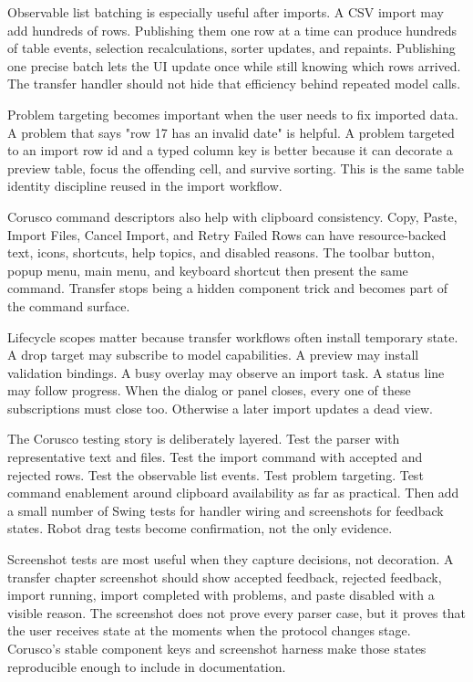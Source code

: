 Observable list batching is especially useful after imports. A CSV import may add hundreds of rows. Publishing them one row at a time can produce hundreds of table events, selection recalculations, sorter updates, and repaints. Publishing one precise batch lets the UI update once while still knowing which rows arrived. The transfer handler should not hide that efficiency behind repeated model calls.

Problem targeting becomes important when the user needs to fix imported data. A problem that says "row 17 has an invalid date" is helpful. A problem targeted to an import row id and a typed column key is better because it can decorate a preview table, focus the offending cell, and survive sorting. This is the same table identity discipline reused in the import workflow.

Corusco command descriptors also help with clipboard consistency. Copy, Paste, Import Files, Cancel Import, and Retry Failed Rows can have resource-backed text, icons, shortcuts, help topics, and disabled reasons. The toolbar button, popup menu, main menu, and keyboard shortcut then present the same command. Transfer stops being a hidden component trick and becomes part of the command surface.

Lifecycle scopes matter because transfer workflows often install temporary state. A drop target may subscribe to model capabilities. A preview may install validation bindings. A busy overlay may observe an import task. A status line may follow progress. When the dialog or panel closes, every one of these subscriptions must close too. Otherwise a later import updates a dead view.

The Corusco testing story is deliberately layered. Test the parser with representative text and files. Test the import command with accepted and rejected rows. Test the observable list events. Test problem targeting. Test command enablement around clipboard availability as far as practical. Then add a small number of Swing tests for handler wiring and screenshots for feedback states. Robot drag tests become confirmation, not the only evidence.

Screenshot tests are most useful when they capture decisions, not decoration. A transfer chapter screenshot should show accepted feedback, rejected feedback, import running, import completed with problems, and paste disabled with a visible reason. The screenshot does not prove every parser case, but it proves that the user receives state at the moments when the protocol changes stage. Corusco's stable component keys and screenshot harness make those states reproducible enough to include in documentation.

